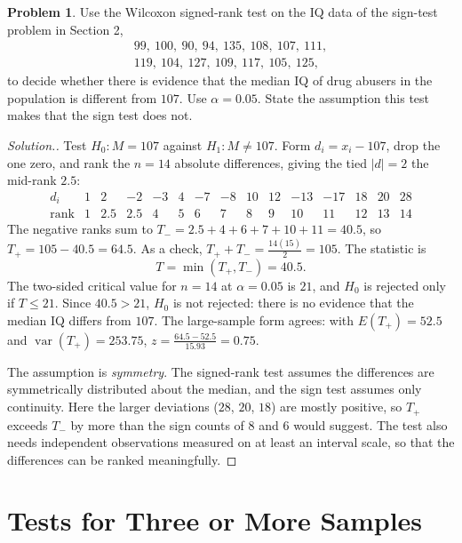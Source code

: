 \documentclass[11pt,a4paper]{article}
\theoremstyle{definition}
\newtheorem{problemx}{Problem}[section]
\newenvironment{problem}{\begin{problemx}}{\end{problemx}}
\newenvironment{solution}
  {\renewcommand{\qedsymbol}{}\begin{proof}[\textit{Solution}.]}
  {\end{proof}}
\begin{document}
\begin{problem}
Use the Wilcoxon signed-rank test on the IQ data of the sign-test problem in Section 2,
\begin{gather*}
99,\ 100,\ 90,\ 94,\ 135,\ 108,\ 107,\ 111,\\
119,\ 104,\ 127,\ 109,\ 117,\ 105,\ 125,
\end{gather*}
to decide whether there is evidence that the median IQ of drug abusers in the population
is different from $107$. Use $\alpha = 0.05$. State the assumption this test makes that
the sign test does not.
\end{problem}

\begin{solution}
Test $H_0: M = 107$ against $H_1: M\neq 107$. Form $d_i = x_i-107$, drop the one zero,
and rank the $n = 14$ absolute differences, giving the tied $|d| = 2$ the mid-rank
$2.5$:
\[\begin{array}{r|cccccccccccccc}
d_i & 1 & 2 & -2 & -3 & 4 & -7 & -8 & 10 & 12 & -13 & -17 & 18 & 20 & 28\\\hline
\text{rank} & 1 & 2.5 & 2.5 & 4 & 5 & 6 & 7 & 8 & 9 & 10 & 11 & 12 & 13 & 14
\end{array}\]
The negative ranks sum to $T_{-} = 2.5+4+6+7+10+11 = 40.5$, so
$T_{+} = 105-40.5 = 64.5$. As a check, $T_{+}+T_{-} = \frac{14(15)}{2} = 105$. The statistic
is
\[T = \min(T_{+}, T_{-}) = 40.5.\]
The two-sided critical value for $n = 14$ at $\alpha = 0.05$ is $21$, and $H_0$ is
rejected only if $T\leq 21$. Since $40.5 > 21$, $H_0$ is not rejected: there is no
evidence that the median IQ differs from $107$. The large-sample form agrees: with
$E(T_{+}) = 52.5$ and $\operatorname{var}(T_{+}) = 253.75$, $z = \frac{64.5-52.5}{15.93} = 0.75$.

The assumption is \emph{symmetry}. The signed-rank test assumes the differences are
symmetrically distributed about the median, and the sign test assumes only
continuity. Here the larger deviations ($28$, $20$, $18$) are mostly positive, so
$T_{+}$ exceeds $T_{-}$ by more than the sign counts of $8$ and $6$ would suggest. The
test also needs independent observations measured on at least an interval scale, so that
the differences can be ranked meaningfully.
\end{solution}


\section{Tests for Three or More Samples}
\end{document}
